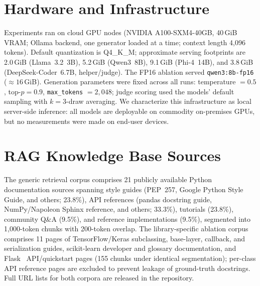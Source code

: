 \documentclass[pdflatex,sn-mathphys-ay]{sn-jnl}%
\theoremstyle{thmstyleone}%
\theoremstyle{thmstyletwo}%
\theoremstyle{thmstylethree}%
\begin{document}
\section{Hardware and Infrastructure}
\label{sec:appendix-hardware}
Experiments ran on cloud GPU nodes (NVIDIA A100-SXM4-40GB, 40\,GiB VRAM; Ollama backend, one generator loaded at a time; context length 4,096 tokens). Default quantization is Q4\_K\_M; approximate serving footprints are 2.0\,GiB (Llama~3.2~3B), 5.2\,GiB (Qwen3~8B), 9.1\,GiB (Phi-4~14B), and 3.8\,GiB (DeepSeek-Coder~6.7B, helper/judge). The FP16 ablation served \texttt{qwen3:8b-fp16} (${\approx}16$\,GiB). Generation parameters were fixed across all runs: temperature $=0.5$, top-$p=0.9$, \texttt{max\_tokens} $=2{,}048$; judge scoring used the models' default sampling with $k{=}3$-draw averaging. We characterize this infrastructure as local server-side inference: all models are deployable on commodity on-premises GPUs, but no measurements were made on end-user devices.

\section{RAG Knowledge Base Sources}
\label{sec:appendix-rag-corpus}
The generic retrieval corpus comprises 21 publicly available Python documentation sources spanning style guides (PEP~257, Google Python Style Guide, and others; 23.8\%), API references (pandas docstring guide, NumPy/Napoleon Sphinx reference, and others; 33.3\%), tutorials (23.8\%), community Q\&A (9.5\%), and reference implementations (9.5\%), segmented into 1,000-token chunks with 200-token overlap. The library-specific ablation corpus comprises 11 pages of TensorFlow/Keras subclassing, base-layer, callback, and serialization guides, scikit-learn developer and glossary documentation, and Flask~\cite{flask} API/quickstart pages (155 chunks under identical segmentation); per-class API reference pages are excluded to prevent leakage of ground-truth docstrings. Full URL lists for both corpora are released in the repository.

\end{document}
